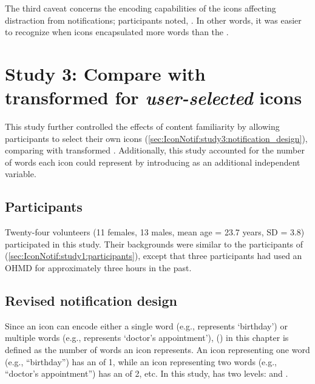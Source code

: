 The third caveat concerns the encoding capabilities of the icons affecting distraction from notifications; participants noted, . In other words, it was easier to recognize  when icons encapsulated more words than the .
















\section{Study 3: Compare  with transformed  for \textit{user-selected} icons}
\label{sec:IconNotif:study3}

This study further controlled the effects of content familiarity by allowing participants to select their own icons (\autoref{sec:IconNotif:study3:notification_design}), comparing  with transformed . Additionally, this study accounted for the number of words each icon could represent by introducing \encodingcomplexity{} as an additional independent variable.

\subsection{Participants}
\label{sec:IconNotif:study3:participants}

Twenty-four volunteers (11 females, 13 males, mean age = 23.7 years, SD = 3.8) participated in this study. Their backgrounds were similar to the participants of \studyone{} (\autoref{sec:IconNotif:study1:participants}), except that three participants had used an OHMD for approximately three hours in the past.

\subsection{Revised notification design}
\label{sec:IconNotif:study3:notification_design}

Since an icon can encode either a single word (e.g.,  represents `birthday') or multiple words (e.g.,  represents `doctor's appointment'), \encodingcomplexity{} (\complexity{}) in this chapter is defined as the number of words an icon represents. An icon representing one word (e.g., ``birthday'') has an \encodingcomplexity{} of 1, while an icon representing two words (e.g., ``doctor's appointment'') has an \encodingcomplexity{} of 2, etc. In this study, \complexity{} has two levels: \single{} and \multi{}.


